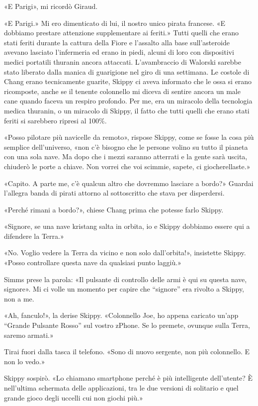 «E Parigi», mi ricordò Giraud.

«E Parigi.» Mi ero dimenticato di lui, il nostro unico pirata francese.
«E dobbiamo prestare attenzione supplementare ai feriti.» Tutti quelli
che erano stati feriti durante la cattura della Fiore e l'assalto alla
base sull'asteroide avevano lasciato l'infermeria ed erano in piedi,
alcuni di loro con dispositivi medici portatili thuranin ancora
attaccati. L'avambraccio di Walorski sarebbe stato liberato dalla manica
di guarigione nel giro di una settimana. Le costole di Chang erano
tecnicamente guarite, Skippy ci aveva informato che le ossa si erano
ricomposte, anche se il tenente colonnello mi diceva di sentire ancora
un male cane quando faceva un respiro profondo. Per me, era un miracolo
della tecnologia medica thuranin, o un miracolo di Skippy, il fatto che
tutti quelli che erano stati feriti si sarebbero ripresi al 100\%.

«Posso pilotare più navicelle da remoto», rispose Skippy, come se fosse
la cosa più semplice dell'universo, «non c'è bisogno che le persone
volino su tutto il pianeta con una sola nave. Ma dopo che i mezzi
saranno atterrati e la gente sarà uscita, chiuderò le porte a chiave.
Non vorrei che voi scimmie, sapete, ci giocherellaste.»

«Capito. A parte me, c'è qualcun altro che dovremmo lasciare a bordo?»
Guardai l'allegra banda di pirati attorno al sottoscritto che stava per
disperdersi.

«Perché rimani a bordo?», chiese Chang prima che potesse farlo Skippy.

«Signore, se una nave kristang salta in orbita, io e Skippy dobbiamo
essere qui a difendere la Terra.»

«No. Voglio vedere la Terra da vicino e non solo dall'orbita!»,
insistette Skippy. «Posso controllare questa nave da qualsiasi punto
laggiù.»

Simms prese la parola: «Il pulsante di controllo delle armi è qui su
questa nave, signore». Mi ci volle un momento per capire che ``signore''
era rivolto a Skippy, non a me.

«Ah, fanculo!», la derise Skippy. «Colonnello Joe, ho appena caricato
un'app ``Grande Pulsante Rosso'' sul vostro zPhone. Se lo premete,
ovunque sulla Terra, saremo armati.»

Tirai fuori dalla tasca il telefono. «Sono di nuovo sergente, non più
colonnello. E non lo vedo.»

Skippy sospirò. «Lo chiamano smartphone perché è più intelligente
dell'utente? È nell'ultima schermata delle applicazioni, tra le due
versioni di solitario e quel grande gioco degli uccelli cui non giochi
più.»

